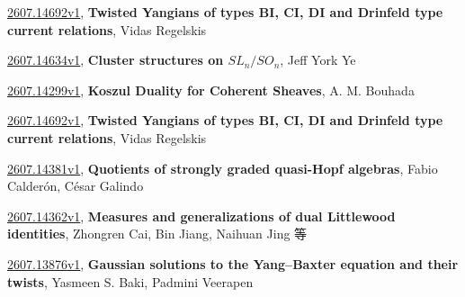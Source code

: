 \documentclass[9pt, a4paper]{article}
\theoremstyle{plain}
\theoremstyle{definition}
\theoremstyle{remark}
\newcommand{\arxiv}[3]{\href{https://arxiv.org/abs/#1}{#1}, \textbf{\textcolor{arxivblue}{#2}}, #3}
\begin{document}
\arxiv{2607.14692v1}{Twisted Yangians of types BI, CI, DI and Drinfeld type current relations}{Vidas Regelskis}

\arxiv{2607.14634v1}{Cluster structures on $SL_n/SO_n$}{Jeff York Ye}

\arxiv{2607.14299v1}{Koszul Duality for Coherent Sheaves}{A. M. Bouhada}

\arxiv{2607.14692v1}{Twisted Yangians of types BI, CI, DI and Drinfeld type current relations}{Vidas Regelskis}

\arxiv{2607.14381v1}{Quotients of strongly graded quasi-Hopf algebras}{Fabio Calderón, César Galindo}

\arxiv{2607.14362v1}{Measures and generalizations of dual Littlewood identities}{Zhongren Cai, Bin Jiang, Naihuan Jing 等}

\arxiv{2607.13876v1}{Gaussian solutions to the Yang--Baxter equation and their twists}{Yasmeen S. Baki, Padmini Veerapen}

\end{document}
